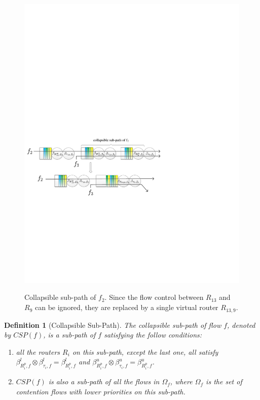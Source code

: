 \documentclass[10pt,journal]{IEEEtran}
\newtheorem{definition}{Definition}
\begin{document}
\begin{figure}
  \centering
  \includegraphics[scale=0.5]{figures/collapse.pdf}\\
  \caption{Collapsible sub-path of $f_2$. Since the flow control between $R_{13}$ and $R_9$ can be ignored, they are replaced by a single virtual router $R_{13,9}$.}\label{collapse}
\end{figure}

\begin{definition}[Collapsible Sub-Path]
The collapsible sub-path of flow $f$, denoted by $CSP(f)$, is a sub-path of $f$ satisfying the follow conditions:
\begin{enumerate}
  \item all the routers $R_i$ on this sub-path, except the last one, all satisfy $\beta_{R_{i}^{p},f}^l\otimes\beta_{\tau_{i},f}^l=\beta_{R_{i}^{p},f}^l$ and $\beta_{R_{i}^{p},f}^u\otimes\beta_{\tau_{i},f}^u=\beta_{R_{i}^{p},f}^u$.
  \item $CSP(f)$ is also a sub-path of all the flows in $\Omega_{f}$, where $\Omega_{f}$ is the set of contention flows with lower priorities on this sub-path.
\end{enumerate}
\end{definition}
\end{document}
